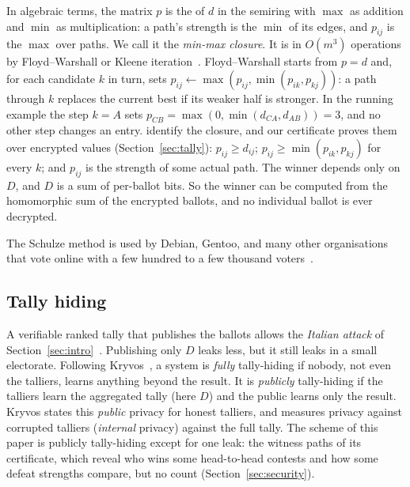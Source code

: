 In algebraic terms, the matrix $p$ is the  of
$d$ in the semiring with $\max$ as addition and $\min$ as multiplication:
a path's strength is the $\min$ of its edges, and $p_{ij}$ is the $\max$
over paths. We call it the \emph{min-max closure}. It is
 in $O(m^3)$ operations by
Floyd--Warshall or Kleene
iteration~\cite{10.1007/978-3-319-66107-0_26}. Floyd--Warshall
starts from $p = d$ and, for each candidate $k$ in turn, sets $p_{ij}
\leftarrow \max(p_{ij}, \min(p_{ik}, p_{kj}))$: a path through $k$
replaces the current best if its weaker half is stronger. In the running
example the step $k = A$ sets $p_{CB} = \max(0, \min(d_{CA}, d_{AB})) =
3$, and no other step changes an entry. 
identify the closure, and our certificate proves them over encrypted
values (Section~\ref{sec:tally}): $p_{ij} \ge d_{ij}$; $p_{ij} \ge
\min(p_{ik}, p_{kj})$ for every $k$; and $p_{ij}$ is the strength of some
actual path. The winner depends only on $D$, and $D$ is a sum of
per-ballot bits. So the winner can be computed from the homomorphic sum
of the encrypted ballots, and no individual ballot is ever decrypted.

The Schulze method is used by Debian, Gentoo, and many other
organisations that vote online with a few hundred to a few thousand
voters~\cite{schulze2018}.

\subsection{Tally hiding}\label{sec:bg:hiding}
A verifiable ranked tally that publishes the ballots allows the
\emph{Italian attack} of
Section~\ref{sec:intro}~\cite{teague2008stv,shufflesum2009}. Publishing
only $D$ leaks less, but it still leaks in a small electorate.
Following Kryvos~\cite{kryvos2022}, a system is \emph{fully}
tally-hiding if nobody, not even the talliers, learns anything beyond the
result. It is \emph{publicly} tally-hiding if the talliers learn the
aggregated tally (here $D$) and the public learns only the result.
Kryvos states this \emph{public} privacy for honest talliers, and
measures privacy against corrupted talliers (\emph{internal} privacy)
against the full tally. The scheme of this paper is publicly tally-hiding except for one leak:
the witness paths of its certificate, which reveal who wins some
head-to-head contests and how some defeat strengths compare, but no
count (Section~\ref{sec:security}).
